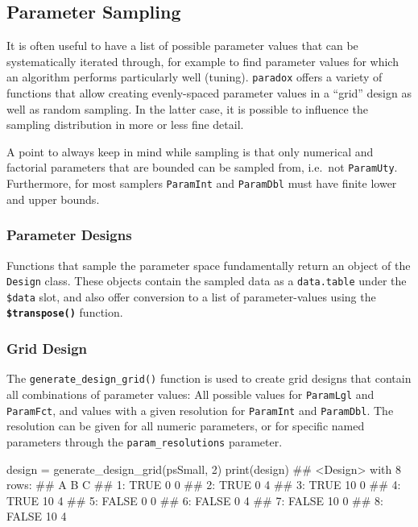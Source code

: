 \documentclass[12pt,]{scrbook}
\newenvironment{Shaded}{}{}
\newcommand{\DecValTok}[1]{#1}
\newcommand{\KeywordTok}[1]{\textcolor[rgb]{0.00,0.00,1.00}{#1}}
\newcommand{\NormalTok}[1]{#1}
\newcommand{\StringTok}[1]{\textcolor[rgb]{0.00,0.50,0.50}{#1}}
\begin{document}
\hypertarget{parameter-sampling}{%
\subsection{Parameter Sampling}\label{parameter-sampling}}

It is often useful to have a list of possible parameter values that can be systematically iterated through, for example to find parameter values for which an algorithm performs particularly well (tuning).
\texttt{paradox} offers a variety of functions that allow creating evenly-spaced parameter values in a ``grid'' design as well as random sampling.
In the latter case, it is possible to influence the sampling distribution in more or less fine detail.

A point to always keep in mind while sampling is that only numerical and factorial parameters that are bounded can be sampled from, i.e.~not \texttt{ParamUty}.
Furthermore, for most samplers \texttt{ParamInt} and \texttt{ParamDbl} must have finite lower and upper bounds.

\hypertarget{parameter-designs}{%
\subsubsection{Parameter Designs}\label{parameter-designs}}

Functions that sample the parameter space fundamentally return an object of the \texttt{Design} class.
These objects contain the sampled data as a \texttt{data.table} under the \texttt{\$data} slot, and also offer conversion to a list of parameter-values using the \textbf{\texttt{\$transpose()}} function.

\hypertarget{grid-design}{%
\subsubsection{Grid Design}\label{grid-design}}

The \texttt{generate\_design\_grid()} function is used to create grid designs that contain all combinations of parameter values: All possible values for \texttt{ParamLgl} and \texttt{ParamFct}, and values with a given resolution for \texttt{ParamInt} and \texttt{ParamDbl}.
The resolution can be given for all numeric parameters, or for specific named parameters through the \texttt{param\_resolutions} parameter.

\begin{Shaded}
\begin{Highlighting}[]
\NormalTok{design =}\StringTok{ }\KeywordTok{generate_design_grid}\NormalTok{(psSmall, }\DecValTok{2}\NormalTok{)}
\KeywordTok{print}\NormalTok{(design)}
\NormalTok{## <Design> with 8 rows:}
\NormalTok{##        A  B C}
\NormalTok{## 1:  TRUE  0 0}
\NormalTok{## 2:  TRUE  0 4}
\NormalTok{## 3:  TRUE 10 0}
\NormalTok{## 4:  TRUE 10 4}
\NormalTok{## 5: FALSE  0 0}
\NormalTok{## 6: FALSE  0 4}
\NormalTok{## 7: FALSE 10 0}
\NormalTok{## 8: FALSE 10 4}
\end{Highlighting}
\end{Shaded}
\end{document}
